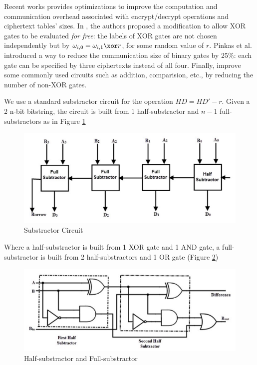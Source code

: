Recent works provides optimizations to improve the computation and communication
overhead associated with encrypt/decrypt operations and ciphertext tables'
sizes. In \cite{kolesnikov2008improved30}, the authors proposed a modification
to allow XOR gates to be evaluated \textit{for free}: the labels of XOR gates
are not chosen independently but by \(\omega_{i,0} = \omega_{i,1} \xor r\), for
some random value of \(r\). Pinkas et al. \cite{pinkas2009secure38} introduced a
way to reduce the communication size of binary gates by 25\%: each gate can be
specified by three ciphertexts instead of all four. Finally,
\cite{kolesnikov2009improved29} improve some commonly used circuits such as
addition, comparision, etc., by reducing the number of non-XOR gates.

We use a standard substractor circuit for the operation \(HD = HD' - r\). Given a 2
n-bit bitstring, the circuit is built from 1 half-substractor and \(n-1\)
full-substractors as in Figure \ref{fig:substractor}

\begin{figure}[htbp!] 
  \centering    
  \includegraphics[width=1.0\textwidth]{Chapter7/Figs/Raster/subCircuit}
  \caption{Substractor Circuit}
  \label{fig:substractor}
\end{figure}

Where a half-substractor is built from 1 XOR gate and 1 AND gate, a
full-substractor is built from 2 half-substractors and 1 OR gate (Figure
\ref{fig:fullSubstractor})

\begin{figure}[htbp!] 
  \centering    
  \includegraphics[width=1.0\textwidth]{Chapter7/Figs/Raster/fullSubstractor}
  \caption{Half-substractor and Full-substractor}
  \label{fig:fullSubstractor}
\end{figure}

